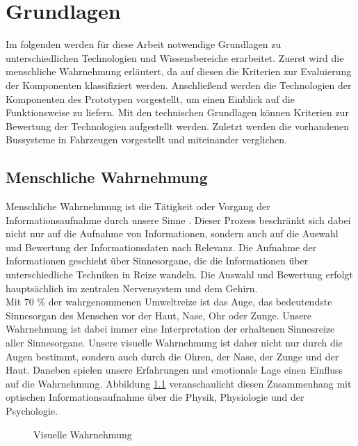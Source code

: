 \chapter{Grundlagen}
\label{cha:Grundlagen}
Im folgenden werden für diese Arbeit notwendige Grundlagen zu unterschiedlichen Technologien und Wissensbereiche erarbeitet. 
Zuerst wird die menschliche Wahrnehmung erläutert, da auf diesen die Kriterien zur Evaluierung der Komponenten klassifiziert werden. Anschließend werden die Technologien der Komponenten des Prototypen vorgestellt, um einen Einblick auf die Funktionsweise zu liefern. Mit den technischen Grundlagen können Kriterien zur Bewertung der Technologien aufgestellt werden. Zuletzt werden die vorhandenen Bussysteme in Fahrzeugen vorgestellt und miteinander verglichen.
\section{Menschliche Wahrnehmung}
Menschliche Wahrnehmung ist die \glqq Tätigkeit oder Vorgang der Informationsaufnahme durch unsere Sinne\grqq{} \cite[Seite 12]{Buhler.2017}. Dieser Prozess beschränkt sich dabei nicht nur auf die Aufnahme von Informationen, sondern auch auf die Auswahl und Bewertung der Informationsdaten nach Relevanz. Die Aufnahme der Informationen geschieht über Sinnesorgane, die die Informationen über unterschiedliche Techniken in Reize wandeln. Die Auswahl und Bewertung erfolgt hauptsächlich im zentralen Nervensystem und dem Gehirn. \cite[Vgl. Seite 12]{Buhler.2017}\\
Mit 70 \% der wahrgenommenen Umweltreize ist das Auge, das bedeutendste Sinnesorgan des Menschen vor der Haut, Nase, Ohr oder Zunge. Unsere Wahrnehmung ist dabei immer eine Interpretation der erhaltenen Sinnesreize aller Sinnesorgane. Unsere visuelle Wahrnehmung ist daher nicht nur durch die Augen bestimmt, sondern auch durch die Ohren, der Nase, der Zunge und der Haut. Daneben spielen unsere Erfahrungen und emotionale Lage einen Einfluss auf die Wahrnehmung. \cite[Vgl. Seite 13 f.]{Buhler.2017}
Abbildung \ref{fig:information} veranschaulicht diesen Zusammenhang mit optischen Informationsaufnahme über die Physik, Physiologie und der Psychologie.\\
\begin{figure}[hbt]
	\centering
	
	\caption[Visuelle Wahrnehmung]{Visuelle Wahrnehmung}
	\label{fig:information}
\end{figure}

